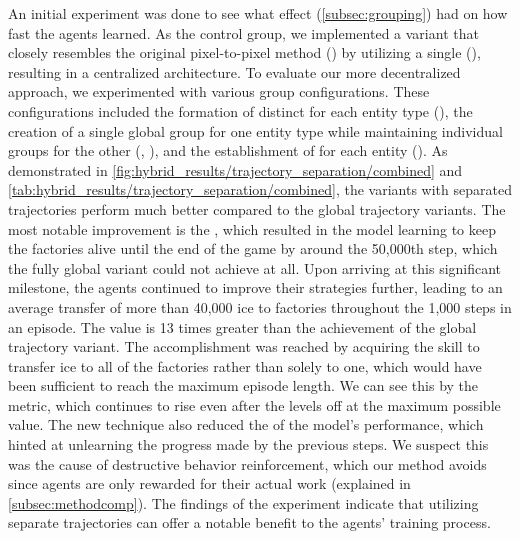 \noindent An initial experiment was done to see what effect  (\autoref{subsec:grouping}) had on how fast the agents learned. As the control group, we implemented a variant that closely resembles the original pixel-to-pixel method (\cite{chen2023emergent}) by utilizing a single  (), resulting in a centralized architecture. To evaluate our more decentralized approach, we experimented with various group configurations. These configurations included the formation of distinct  for each entity type (), the creation of a single global group for one entity type while maintaining individual groups for the other (, ), and the establishment of  for each entity (). As demonstrated in \autoref{fig:hybrid_results/trajectory_separation/combined} and \autoref{tab:hybrid_results/trajectory_separation/combined}, the variants with separated trajectories perform much better compared to the global trajectory variants. The most notable improvement is the , which resulted in the model learning to keep the factories alive until the end of the game by around the 50,000th step, which the fully global variant could not achieve at all. Upon arriving at this significant milestone, the agents continued to improve their strategies further, leading to an average transfer of more than 40,000 ice to factories throughout the 1,000 steps in an episode. The value is 13 times greater than the achievement of the global trajectory variant. The accomplishment was reached by acquiring the skill to transfer ice to all of the factories rather than solely to one, which would have been sufficient to reach the maximum episode length. We can see this by the  metric, which continues to rise even after the  levels off at the maximum possible value. The new technique also reduced the  of the model's performance, which hinted at unlearning the progress made by the previous steps. We suspect this was the cause of destructive behavior reinforcement, which our method avoids since agents are only rewarded for their actual work (explained in \autoref{subsec:methodcomp}). The findings of the experiment indicate that utilizing separate trajectories can offer a notable benefit to the agents' training process.

